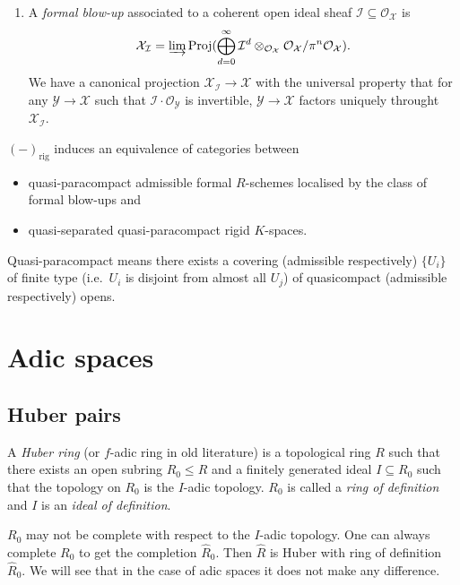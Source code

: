 \documentclass[a4paper]{article}
\newcommand{\sh}[1]{\mathcal{#1}} %
\begin{document}
\begin{enumerate}
\item A \emph{formal blow-up} associated to a coherent open ideal sheaf \(\sh I \subseteq \sh O_{\mathcal X}\) is
  \[
    \mathcal X_{\sh I} = \varinjlim \mathrm{Proj} (\bigoplus_{d = 0}^\infty \sh I^d \otimes_{\sh O_{\mathcal X}} \sh O_{\mathcal X}/\pi^n \sh O_{\mathcal X}).
  \]
  We have a canonical projection \(\mathcal X_{\sh I} \to \mathcal X\) with the universal property that for any \(\mathcal Y \to \mathcal X\) such that \(\sh I \cdot \sh O_{\mathcal{Y}}\) is invertible, \(\mathcal{Y} \to \mathcal{X}\) factors uniquely throught \(\mathcal{X}_{\sh I}\).
\end{enumerate}

\begin{theorem}[Raynaud]
  \((-)_{\mathrm{rig}}\) induces an equivalence of categories between
  \begin{itemize}
  \item quasi-paracompact admissible formal \(R\)-schemes localised by the class of formal blow-ups and
  \item quasi-separated quasi-paracompact rigid \(K\)-spaces.
  \end{itemize}

  Quasi-paracompact means there exists a covering (admissible respectively) \(\{U_i\}\) of finite type (i.e.\ \(U_i\) is disjoint from almost all \(U_j\)) of quasicompact (admissible respectively) opens.
\end{theorem}

\section{Adic spaces}

\subsection{Huber pairs}

\begin{definition}
  A \emph{Huber ring} (or \(f\)-adic ring in old literature) is a topological ring \(R\) such that there exists an open subring \(R_0 \leq R\) and a finitely generated ideal \(I \subseteq R_0\) such that the topology on \(R_0\) is the \(I\)-adic topology. \(R_0\) is called a \emph{ring of definition} and \(I\) is an \emph{ideal of definition}.
\end{definition}

\begin{remark}
  \(R_0\) may not be complete with respect to the \(I\)-adic topology. One can always complete \(R_0\) to get the completion \(\hat R_0\). Then \(\hat R\) is Huber with ring of definition \(\hat R_0\). We will see that in the case of adic spaces it does not make any difference.
\end{remark}
\end{document}

